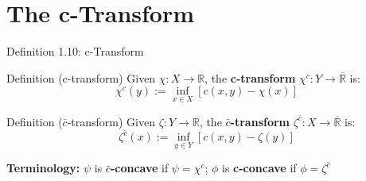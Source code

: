 \documentclass[aspectratio=169]{beamer}
\newcommand{\R}{\mathbb{R}}
\begin{document}
\section{The c-Transform}

\begin{frame}{Definition 1.10: c-Transform}
\begin{block}{Definition (c-transform)}
Given $\chi: X \to \R$, the \textbf{c-transform} $\chi^c: Y \to \overline{\R}$ is:
\[
\boxed{\chi^c(y) := \inf_{x \in X} \left[ c(x,y) - \chi(x) \right]}
\]
\end{block}

\begin{block}{Definition ($\bar{c}$-transform)}
Given $\zeta: Y \to \R$, the \textbf{$\bar{c}$-transform} $\zeta^{\bar{c}}: X \to \overline{\R}$ is:
\[
\boxed{\zeta^{\bar{c}}(x) := \inf_{y \in Y} \left[ c(x,y) - \zeta(y) \right]}
\]
\end{block}

\textbf{Terminology:} $\psi$ is \textbf{$\bar{c}$-concave} if $\psi = \chi^c$; \quad $\phi$ is \textbf{c-concave} if $\phi = \zeta^{\bar{c}}$
\end{frame}
\end{document}
